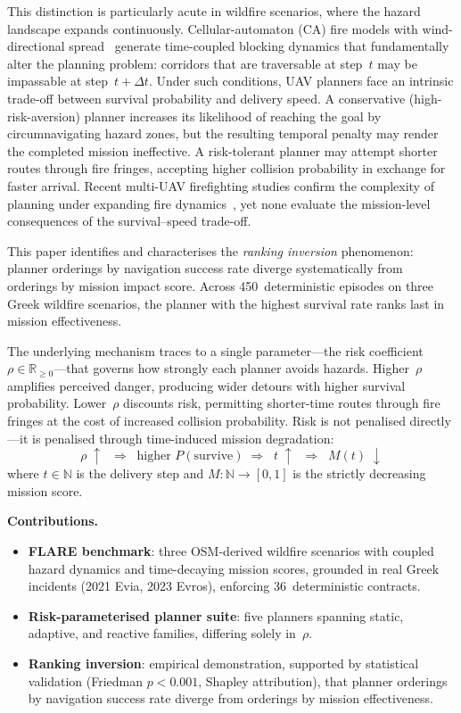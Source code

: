 \documentclass[drones,article,submit,moreauthors]{Definitions/mdpi}
\begin{document}
This distinction is particularly acute in wildfire scenarios, where the
hazard landscape expands continuously. Cellular-automaton (CA) fire
models with wind-directional
spread~\cite{Alexandridis2008,Giannino2025,Sahila2025} generate
time-coupled blocking dynamics that fundamentally alter the
planning problem: corridors that are traversable at step~$t$ may be
impassable at step~$t{+}\Delta t$. Under such conditions, UAV planners
face an intrinsic trade-off between survival probability and delivery
speed. A conservative (high-risk-aversion) planner increases its
likelihood of reaching the goal by circumnavigating hazard zones, but
the resulting temporal penalty may render the completed mission
ineffective. A risk-tolerant planner may attempt shorter routes through
fire fringes, accepting higher collision probability in exchange for
faster arrival. Recent multi-UAV firefighting studies confirm the
complexity of planning under expanding fire
dynamics~\cite{Wang2025fire,Liu2025swarm}, yet none evaluate the
mission-level consequences of the survival--speed trade-off.

This paper identifies and characterises the \emph{ranking inversion}
phenomenon: planner orderings by navigation success rate diverge
systematically from orderings by mission impact score. Across
450~deterministic episodes on three Greek wildfire scenarios, the planner
with the highest survival rate ranks last in mission effectiveness.

The underlying mechanism traces to a single parameter---the risk
coefficient~$\rho \in \mathbb{R}_{\geq 0}$---that governs how strongly
each planner avoids hazards. Higher~$\rho$ amplifies perceived danger,
producing wider detours with higher survival probability.
Lower~$\rho$ discounts risk, permitting shorter-time routes through fire
fringes at the cost of increased collision probability. Risk is not
penalised directly---it is penalised through time-induced mission
degradation:
\begin{equation}
  \rho \;\uparrow\;\; \Rightarrow \;\;
  \text{higher } P(\text{survive}) \;\Rightarrow\;\;
  t \;\uparrow\;\; \Rightarrow \;\;
  M(t) \;\downarrow
\end{equation}
where $t \in \mathbb{N}$ is the delivery step and $M: \mathbb{N} \to [0,1]$
is the strictly decreasing mission score.

\textbf{Contributions.}
\begin{itemize}[nosep,leftmargin=*]
  \item \textbf{FLARE benchmark}: three OSM-derived wildfire scenarios with
    coupled hazard dynamics and time-decaying mission scores, grounded in
    real Greek incidents (2021 Evia, 2023 Evros), enforcing 36~deterministic
    contracts.
  \item \textbf{Risk-parameterised planner suite}: five planners spanning
    static, adaptive, and reactive families, differing solely in~$\rho$.
  \item \textbf{Ranking inversion}: empirical demonstration, supported
    by statistical validation (Friedman $p < 0.001$, Shapley attribution),
    that planner orderings by navigation success rate diverge from orderings
    by mission effectiveness.
\end{itemize}
\end{document}
